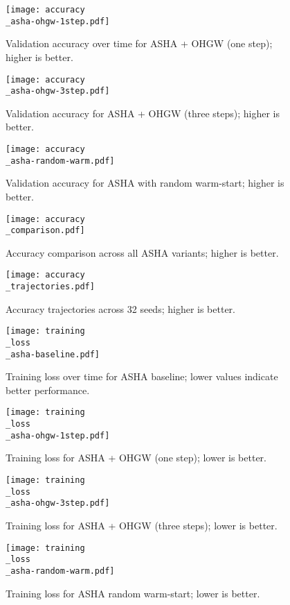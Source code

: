 \documentclass{article}
\begin{document}
\begin{figure}[H]
    \centering
    \texttt{[image: accuracy\\\_asha-ohgw-1step.pdf]}
    \caption{Validation accuracy over time for ASHA + OHGW (one step); higher is better.}
\end{figure}

\begin{figure}[H]
    \centering
    \texttt{[image: accuracy\\\_asha-ohgw-3step.pdf]}
    \caption{Validation accuracy for ASHA + OHGW (three steps); higher is better.}
\end{figure}

\begin{figure}[H]
    \centering
    \texttt{[image: accuracy\\\_asha-random-warm.pdf]}
    \caption{Validation accuracy for ASHA with random warm-start; higher is better.}
\end{figure}

\begin{figure}[H]
    \centering
    \texttt{[image: accuracy\\\_comparison.pdf]}
    \caption{Accuracy comparison across all ASHA variants; higher is better.}
\end{figure}

\begin{figure}[H]
    \centering
    \texttt{[image: accuracy\\\_trajectories.pdf]}
    \caption{Accuracy trajectories across 32 seeds; higher is better.}
\end{figure}

\begin{figure}[H]
    \centering
    \texttt{[image: training\\\_loss\\\_asha-baseline.pdf]}
    \caption{Training loss over time for ASHA baseline; lower values indicate better performance.}
\end{figure}

\begin{figure}[H]
    \centering
    \texttt{[image: training\\\_loss\\\_asha-ohgw-1step.pdf]}
    \caption{Training loss for ASHA + OHGW (one step); lower is better.}
\end{figure}

\begin{figure}[H]
    \centering
    \texttt{[image: training\\\_loss\\\_asha-ohgw-3step.pdf]}
    \caption{Training loss for ASHA + OHGW (three steps); lower is better.}
\end{figure}

\begin{figure}[H]
    \centering
    \texttt{[image: training\\\_loss\\\_asha-random-warm.pdf]}
    \caption{Training loss for ASHA random warm-start; lower is better.}
\end{figure}
\end{document}
